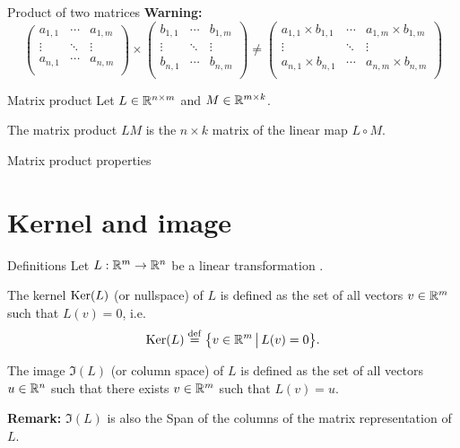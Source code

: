 \documentclass{beamer}
\begin{document}
\begin{frame}[t]{Product of two matrices}
	\textbf{Warning:}
	{\small
		$$
		\!\!\!\!\!\!\!\!\!\!\!\!
		\begin{pmatrix}
			a_{1,1}  & \cdots & a_{1,m} \\
			\vdots & \ddots & \vdots \\
			a_{n,1} & \cdots & a_{n,m} \\
		\end{pmatrix}
		\times
		\begin{pmatrix}
			b_{1,1}  & \cdots & b_{1,m} \\
			\vdots & \ddots & \vdots \\
			b_{n,1} & \cdots & b_{n,m} \\
		\end{pmatrix}
		\neq
		\begin{pmatrix}
			a_{1,1} \times b_{1,1}  & \cdots & a_{1,m} \times b_{1,m} \\
			\vdots & \ddots & \vdots \\
			a_{n,1} \times b_{n,1} & \cdots & a_{n,m} \times b_{n,m} \\
		\end{pmatrix}
		$$
	}
\end{frame}

\begin{frame}[t]{Matrix product}
	Let $L \in \mathbb{R}^{n \times m}$ and $M \in \mathbb{R}^{m \times k}$. 
\begin{definition}
	The matrix product $LM$ is the $n \times k$ matrix of the linear map $L \circ M$.
\end{definition}
\end{frame}
\begin{frame}[t]{Matrix product properties}
\end{frame}

\section{Kernel and image}

\begin{frame}[t]{Definitions}
	Let \quad $L: \mathbb{R}^m \to \mathbb{R}^n$ \quad be a linear transformation .
\begin{definition}[Kernel]
	The kernel ${{\rm Ker}}(L)$ (or nullspace) of $L$ is defined as the set of all vectors $v \in \mathbb{R}^m$ such that $L(v) = 0$, i.e.
	$$
	{{\rm Ker}}(L) \overset{\rm def}{=} \big\{ v \in \mathbb{R}^m \, \big| \, L(v) = 0 \big\}.
	$$
\end{definition}

\begin{definition}[Image]
	The image $\Im(L)$ (or column space) of $L$ is defined as the set of all vectors $u \in \mathbb{R}^n$ such that there exists $v \in \mathbb{R}^m$ such that $L(v) = u$. 
\end{definition}
\textbf{Remark:} $\Im(L)$ is also the Span of the columns of the matrix representation of $L$.
\end{frame}
\end{document}
